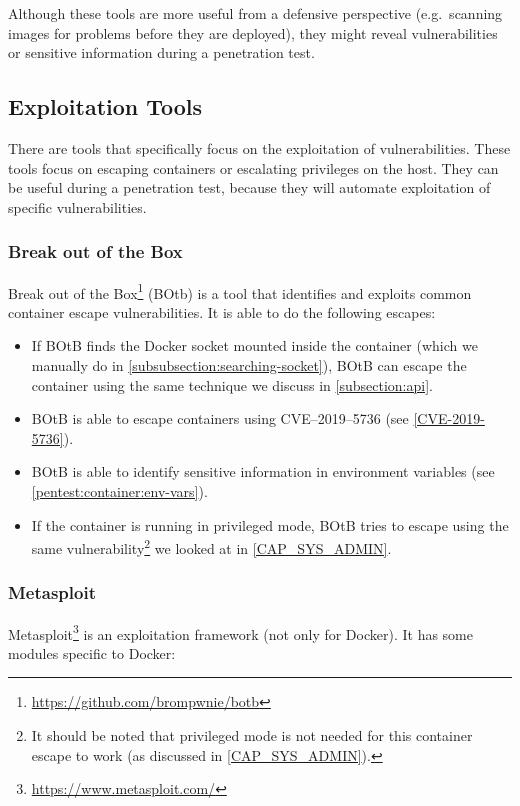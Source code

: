 Although these tools are more useful from a defensive perspective (e.g.\ scanning images for problems before they are deployed), they might reveal vulnerabilities or sensitive information during a penetration test.

\subsection{Exploitation Tools}\label{subsection:offensive-tools}
There are tools that specifically focus on the exploitation of vulnerabilities. These tools focus on escaping containers or escalating privileges on the host. They can be useful during a penetration test, because they will automate exploitation of specific vulnerabilities.

\subsubsection{Break out of the Box}
Break out of the Box\footnote{\url{https://github.com/brompwnie/botb}} (BOtb) is a tool that identifies and exploits common container escape vulnerabilities. It is able to do the following escapes:

\begin{itemize}
    \item If BOtB finds the Docker socket mounted inside the container (which we manually do in \autoref{subsubsection:searching-socket}), BOtB can escape the container using the same technique we discuss in \autoref{subsection:api}.

    \item BOtB is able to escape containers using CVE--2019--5736 (see \autoref{CVE-2019-5736}).

    \item BOtB is able to identify sensitive information in environment variables (see \autoref{pentest:container:env-vars}).

    \item If the container is running in privileged mode, BOtB tries to escape using the same vulnerability\cite{TrailOfBits-Docker-Escape}\footnote{It should be noted that privileged mode is not needed for this container escape to work (as discussed in \autoref{CAP_SYS_ADMIN}).} we looked at in \autoref{CAP_SYS_ADMIN}.
\end{itemize}

\subsubsection{Metasploit}
Metasploit\footnote{\url{https://www.metasploit.com/}} is an exploitation framework (not only for Docker). It has some modules specific to Docker:

